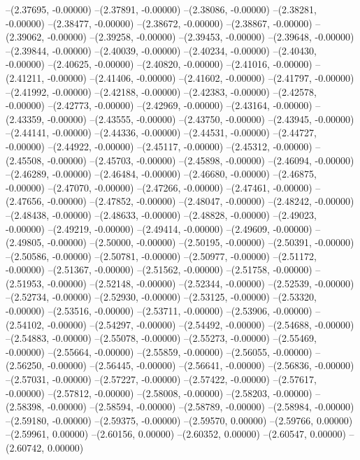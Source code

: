 --(2.37695, -0.00000)
--(2.37891, -0.00000)
--(2.38086, -0.00000)
--(2.38281, -0.00000)
--(2.38477, -0.00000)
--(2.38672, -0.00000)
--(2.38867, -0.00000)
--(2.39062, -0.00000)
--(2.39258, -0.00000)
--(2.39453, -0.00000)
--(2.39648, -0.00000)
--(2.39844, -0.00000)
--(2.40039, -0.00000)
--(2.40234, -0.00000)
--(2.40430, -0.00000)
--(2.40625, -0.00000)
--(2.40820, -0.00000)
--(2.41016, -0.00000)
--(2.41211, -0.00000)
--(2.41406, -0.00000)
--(2.41602, -0.00000)
--(2.41797, -0.00000)
--(2.41992, -0.00000)
--(2.42188, -0.00000)
--(2.42383, -0.00000)
--(2.42578, -0.00000)
--(2.42773, -0.00000)
--(2.42969, -0.00000)
--(2.43164, -0.00000)
--(2.43359, -0.00000)
--(2.43555, -0.00000)
--(2.43750, -0.00000)
--(2.43945, -0.00000)
--(2.44141, -0.00000)
--(2.44336, -0.00000)
--(2.44531, -0.00000)
--(2.44727, -0.00000)
--(2.44922, -0.00000)
--(2.45117, -0.00000)
--(2.45312, -0.00000)
--(2.45508, -0.00000)
--(2.45703, -0.00000)
--(2.45898, -0.00000)
--(2.46094, -0.00000)
--(2.46289, -0.00000)
--(2.46484, -0.00000)
--(2.46680, -0.00000)
--(2.46875, -0.00000)
--(2.47070, -0.00000)
--(2.47266, -0.00000)
--(2.47461, -0.00000)
--(2.47656, -0.00000)
--(2.47852, -0.00000)
--(2.48047, -0.00000)
--(2.48242, -0.00000)
--(2.48438, -0.00000)
--(2.48633, -0.00000)
--(2.48828, -0.00000)
--(2.49023, -0.00000)
--(2.49219, -0.00000)
--(2.49414, -0.00000)
--(2.49609, -0.00000)
--(2.49805, -0.00000)
--(2.50000, -0.00000)
--(2.50195, -0.00000)
--(2.50391, -0.00000)
--(2.50586, -0.00000)
--(2.50781, -0.00000)
--(2.50977, -0.00000)
--(2.51172, -0.00000)
--(2.51367, -0.00000)
--(2.51562, -0.00000)
--(2.51758, -0.00000)
--(2.51953, -0.00000)
--(2.52148, -0.00000)
--(2.52344, -0.00000)
--(2.52539, -0.00000)
--(2.52734, -0.00000)
--(2.52930, -0.00000)
--(2.53125, -0.00000)
--(2.53320, -0.00000)
--(2.53516, -0.00000)
--(2.53711, -0.00000)
--(2.53906, -0.00000)
--(2.54102, -0.00000)
--(2.54297, -0.00000)
--(2.54492, -0.00000)
--(2.54688, -0.00000)
--(2.54883, -0.00000)
--(2.55078, -0.00000)
--(2.55273, -0.00000)
--(2.55469, -0.00000)
--(2.55664, -0.00000)
--(2.55859, -0.00000)
--(2.56055, -0.00000)
--(2.56250, -0.00000)
--(2.56445, -0.00000)
--(2.56641, -0.00000)
--(2.56836, -0.00000)
--(2.57031, -0.00000)
--(2.57227, -0.00000)
--(2.57422, -0.00000)
--(2.57617, -0.00000)
--(2.57812, -0.00000)
--(2.58008, -0.00000)
--(2.58203, -0.00000)
--(2.58398, -0.00000)
--(2.58594, -0.00000)
--(2.58789, -0.00000)
--(2.58984, -0.00000)
--(2.59180, -0.00000)
--(2.59375, -0.00000)
--(2.59570, 0.00000)
--(2.59766, 0.00000)
--(2.59961, 0.00000)
--(2.60156, 0.00000)
--(2.60352, 0.00000)
--(2.60547, 0.00000)
--(2.60742, 0.00000)
